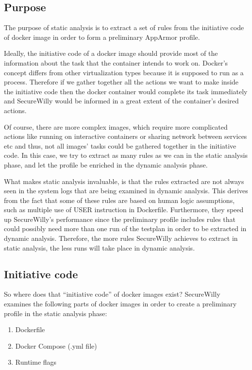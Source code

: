 \subsection{Purpose}
The purpose of static analysis is to extract a set of rules from the initiative code of docker image in order to form a preliminary AppArmor profile.

Ideally, the initiative code of a docker image should provide most of the information about the task that the container intends to work on. Docker's concept differs from other virtualization types because it is supposed to run as a process. Therefore if we gather together all the actions we want to make inside the initiative code then the docker container would complete its task immediately and SecureWilly would be informed in a great extent of the container's desired actions.

Of course, there are more complex images, which require more complicated actions like running on interactive containers or sharing network between services etc and thus, not all images' tasks could be gathered together in the initiative code. In this case, we try to extract as many rules as we can in the static analysis phase, and let the profile be enriched in the dynamic analysis phase.
 
What makes static analysis invaluable, is that the rules extracted are not always seen in the system logs that are being examined in dynamic analysis. This derives from the fact that some of these rules are based on human logic assumptions, such as multiple use of USER instruction in Dockerfile. Furthermore, they speed up SecureWilly's performance since the preliminary profile includes rules that could possibly need more than one run of the testplan in order to be extracted in dynamic analysis. Therefore, the more rules SecureWilly achieves to extract in static analysis, the less runs will take place in dynamic analysis.

\subsection{Initiative code}
So where does that “initiative code” of docker images exist?
SecureWilly examines the following parts of docker images in order to create  a preliminary profile in the static analysis phase:

\begin{enumerate}
\item Dockerfile
\item Docker Compose (.yml file)
\item Runtime flags
\end{enumerate}

